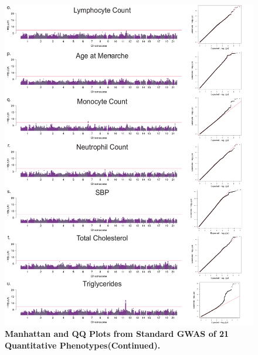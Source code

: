  
\begin{figure}[!htb]
\ContinuedFloat
\centering
\includegraphics[width=5in]{img/ch02/fig-s1c.pdf}
\caption[Manhattan and QQ Plots from Standard GWAS of 21 Quantitative Phenotypes (Continued).]{\textbf{Manhattan and QQ Plots from Standard GWAS of 21 Quantitative Phenotypes(Continued).} }
\label{fig:fig-s1c}
\end{figure}





